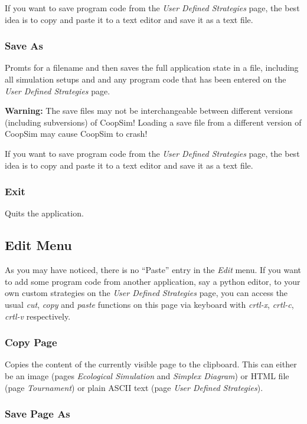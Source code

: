 \documentclass[12pt,a4paper,USenglish]{article}
\begin{document}
If you want to save program code from the \emph{User Defined Strategies}
page, the best idea is to copy and paste it to a text editor and save
it as a text file.


\subsubsection{Save As}

Promts for a filename and then saves the full application state in
a file, including all simulation setups and and any program code that
has been entered on the \emph{User Defined Strategies} page.

{\bf Warning:} The save files may not be interchangeable between different
versions (including subversions) of CoopSim! Loading a save file from
a different version of CoopSim may cause CoopSim to crash!

If you want to save program code from the \emph{User Defined Strategies}
page, the best idea is to copy and paste it to a text editor and save
it as a text file.


\subsubsection{Exit}

Quits the application.


\subsection{Edit Menu}

As you may have noticed, there is no ``Paste'' entry in the \emph{Edit} menu.
If you want to add some program code from another application, say a python
editor, to your own custom strategies on the \emph{User Defined Strategies}
page, you can access the usual {\em cut}, {\em copy} and {\em paste} functions
on this page via keyboard with \emph{crtl-x}, \emph{crtl-c}, \emph{crtl-v}
respectively.


\subsubsection{Copy Page}

Copies the content of the currently visible page to the clipboard.  This can
either be an image (pages \emph{Ecological Simulation} and \emph{Simplex
  Diagram}) or HTML file (page \emph{Tournament}) or plain ASCII text (page
\emph{User Defined Strategies}).


\subsubsection{Save Page As}
\end{document}
